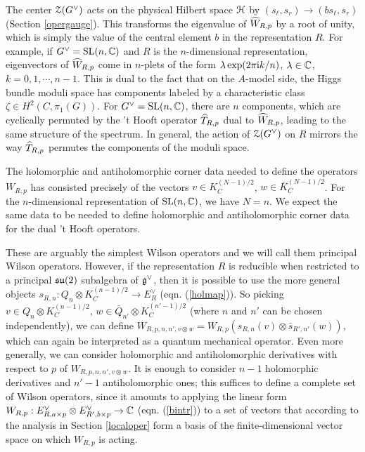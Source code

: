 \documentclass[11pt,a4paper]{article}
\begin{document}
The center ${\mathcal Z}(G^\vee)$ acts on the physical Hilbert space ${\mathcal H}$ by $(s_\ell, s_r)\to (b s_\ell, s_r)$ (Section \ref{opergauge}).   This transforms
the eigenvalue of $\widehat W_{R,p}$ by a root of unity, which is simply the value of the central element $b$ in the representation $R$.   For example,
if $G^\vee={\mathrm{SL}}(n,{\mathbb C})$ and $R$ is the $n$-dimensional representation, eigenvectors of $\widehat W_{R,p}$ come in $n$-plets of the form
$\lambda\exp(2\pi {\mathrm i} k/n)$, $\lambda\in{\mathbb C}$, $k=0,1,\cdots, n-1$.   This is dual to the fact that on the $A$-model side, the Higgs bundle moduli space
has components labeled by a characteristic class $\zeta\in H^2(C,\pi_1(G))$.   For $G^\vee={\mathrm{SL}}(n,{\mathbb C})$, there are $n$ components,
which are cyclically permuted by the 't Hooft operator $\widehat T_{R,p}$ dual to $\widehat W_{R,p}$, leading to the same structure of the spectrum.   
In general, the action of ${\mathcal Z}(G^\vee)$ on $R$ mirrors the way $\widehat T_{R,p}$ permutes the components of the moduli space. 

The holomorphic and antiholomorphic 
corner data needed to define the operators $W_{R,p}$ has consisted precisely of the vectors $v\in K_C^{(N-1)/2}$, $w\in \bar K_C^{(N-1)/2}$.  For the $n$-dimensional
representation of ${\mathrm{SL}}(n,{\mathbb C})$, we have $N=n$.
We expect the same data to be needed to define holomorphic and antiholomorphic corner data for the dual 't Hooft operators.


These are arguably the simplest Wilson operators and we will call them principal Wilson
operators.   However, if the representation $R$ is reducible when restricted to a principal ${\mathfrak {su}}(2)$ subalgebra of ${\mathfrak g}^\vee$, then it is possible
to use the more general objects $s_{R,n}:Q_n\otimes K_C^{(n-1)/2}\to E^\vee_R$ (eqn. (\ref{holmap})).   So picking $v\in Q_n \otimes K_C^{(n-1)/2}$,
$w\in \bar Q_{n'}\otimes K_C^{(n'-1)/2}$ (where $n$ and $n'$ can be chosen independently), we can define $W_{R,p,n,n',v\otimes w}=W_{R,p}(s_{R,n}(v)\otimes
\bar s_{R',n'}(w))$, which can again be interpreted as a quantum mechanical operator.  Even more generally, we can consider holomorphic and antiholomorphic derivatives with respect to $p$ of $W_{R,p,n,n',v\otimes w} $.   It is enough to consider $n-1$ holomorphic derivatives and $n'-1$ antiholomorphic
ones; this suffices to define a complete set of Wilson operators,
since it amounts to applying the  linear form  $W_{R,p}:E^\vee_{R,a\times p}\otimes E^\vee_{R',b\times p}\to {\mathbb C} $ 
(eqn. (\ref{bintr})) to a set of vectors that according to the analysis 
in Section \ref{localoper}
form a basis of the finite-dimensional vector space on which $W_{R,p}$ is acting.
\end{document}
